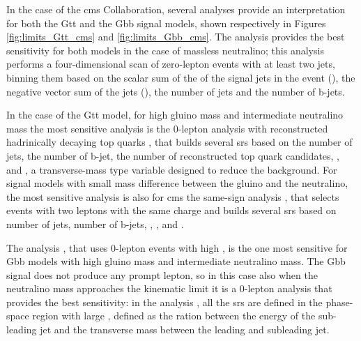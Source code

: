 In the case of the \gls{cms} Collaboration, several analyses provide an interpretation for both the Gtt and 
the Gbb signal models, shown respectively in Figures \ref{fig:limits_Gtt_cms} and \ref{fig:limits_Gbb_cms}.
The \htmiss analysis \cite{Sirunyan:2017cwe} provides the best sensitivity for both models in the case of massless 
neutralino; this analysis performs a four-dimensional scan of zero-lepton events with at least two jets, binning them 
based on the scalar sum of the \pt of the signal jets in the event (\Ht), the negative vector sum of the jets (\htmiss), 
the number of jets and the number of b-jets. 

In the case of the Gtt model, for high gluino mass and intermediate neutralino mass the most sensitive analysis is
the 0-lepton analysis with reconstructed hadrinically decaying top quarks \cite{Sirunyan:2017pjw}, 
that builds several \glspl{sr} based on the number of jets, the number of b-jet, the number of reconstructed top quark 
candidates, \met, \Ht and \mttwo, a transverse-mass type variable designed to reduce the \ttbar background. 
For signal models with small mass difference between the gluino and the neutralino, the most sensitive analysis 
is also for \gls{cms} the same-sign analysis \cite{Sirunyan:2017uyt}, that selects events with two leptons with 
the same charge and builds several \glspl{sr} based on number of jets, number of b-jets, \met, \Ht, and \mt. 

The \mttwo analysis \cite{Sirunyan:2017kqq}, that uses 0-lepton events with high \mttwo,
 is the one most sensitive for Gbb models with high gluino mass 
and intermediate neutralino mass. 
The Gbb signal does not produce any prompt lepton, so in this case also when the neutralino mass approaches the kinematic 
limit it is a 0-lepton analysis that provides the best sensitivity: 
in the \alphat analysis \cite{Sirunyan:2018vjp}, all the \glspl{sr} are defined in the phase-space region 
with large \alphat, defined as the ration between the energy of the sub-leading jet and the transverse mass
between the leading and subleading jet. 

